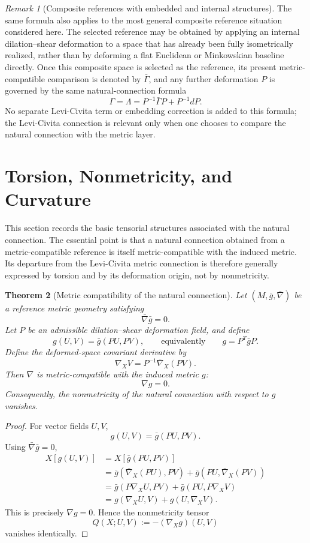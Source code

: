 \documentclass[12pt]{amsart}
\newtheorem{theorem}{Theorem}[section]
\theoremstyle{definition}
\theoremstyle{remark}
\newtheorem{remark}[theorem]{Remark}
\begin{document}
\begin{remark}[Composite references with embedded and internal structures]\label{rem:composite_reference_interpretation}
The same formula also applies to the most general composite reference situation considered here.  The selected reference may be obtained by applying an internal dilation--shear deformation to a space that has already been fully isometrically realized, rather than by deforming a flat Euclidean or Minkowskian baseline directly.  Once this composite space is selected as the reference, its present metric-compatible comparison is denoted by \(\bar\Gamma\), and any further deformation \(P\) is governed by the same natural-connection formula
\[
 \Gamma=\Lambda=P^{-1}\bar\Gamma P+P^{-1}dP.
\]
No separate Levi-Civita term or embedding correction is added to this formula; the Levi-Civita connection is relevant only when one chooses to compare the natural connection with the metric layer.
\end{remark}

\section{Torsion, Nonmetricity, and Curvature}\label{sec:torsion_curvature}

This section records the basic tensorial structures associated with the natural connection.  The essential point is that a natural connection obtained from a metric-compatible reference is itself metric-compatible with the induced metric.  Its departure from the Levi-Civita metric connection is therefore generally expressed by torsion and by its deformation origin, not by nonmetricity.

\begin{theorem}[Metric compatibility of the natural connection]\label{thm:natural_metric_compatibility}
Let \((M,\bar g,\bar\nabla)\) be a reference metric geometry satisfying
\[
 \bar\nabla\bar g=0.
\]
Let \(P\) be an admissible dilation--shear deformation field, and define
\[
 g(U,V)=\bar g(PU,PV),
 \qquad\text{equivalently}\qquad
 g=P^T\bar gP.
\]
Define the deformed-space covariant derivative by
\[
 \nabla_XV=P^{-1}\bar\nabla_X(PV).
\]
Then \(\nabla\) is metric-compatible with the induced metric \(g\):
\[
 \nabla g=0.
\]
Consequently, the nonmetricity of the natural connection with respect to \(g\) vanishes.
\end{theorem}

\begin{proof}
For vector fields \(U,V\),
\[
 g(U,V)=\bar g(PU,PV).
\]
Using \(\bar\nabla\bar g=0\),
\begin{align*}
 X[g(U,V)]
 &=X[\bar g(PU,PV)]\\
 &=\bar g(\bar\nabla_X(PU),PV)
   +\bar g(PU,\bar\nabla_X(PV))\\
 &=\bar g(P\nabla_XU,PV)+\bar g(PU,P\nabla_XV)\\
 &=g(\nabla_XU,V)+g(U,\nabla_XV).
\end{align*}
This is precisely \(\nabla g=0\).  Hence the nonmetricity tensor
\[
 Q(X;U,V):=-(\nabla_Xg)(U,V)
\]
vanishes identically.
\end{proof}
\end{document}
